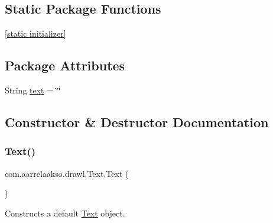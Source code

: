 \subsection*{Static Package Functions}
\begin{DoxyCompactItemize}
\item 
\hyperlink{classcom_1_1aarrelaakso_1_1drawl_1_1_shape_ad2adcb85374cf5d6d59429628314e8d1}{\mbox{[}static initializer\mbox{]}}
\end{DoxyCompactItemize}
\subsection*{Package Attributes}
\begin{DoxyCompactItemize}
\item 
String \hyperlink{classcom_1_1aarrelaakso_1_1drawl_1_1_text_a8889cc854715e5a1b9195ca490c03865}{text} = \char`\"{}\char`\"{}
\end{DoxyCompactItemize}


\subsection{Constructor \& Destructor Documentation}
\mbox{\label{classcom_1_1aarrelaakso_1_1drawl_1_1_text_a9d9bdd3df91ff551c7bf96f741cde0e9}} 
\subsubsection{\texorpdfstring{Text()}{Text()}\hspace{0.1cm}{\footnotesize\ttfamily [1/2]}}
{\footnotesize\ttfamily com.\+aarrelaakso.\+drawl.\+Text.\+Text (\begin{DoxyParamCaption}{ }\end{DoxyParamCaption})}

Constructs a default \hyperlink{classcom_1_1aarrelaakso_1_1drawl_1_1_text}{Text} object. \mbox{\label{classcom_1_1aarrelaakso_1_1drawl_1_1_text_ab135a782032f1985b39753bd303a3894}} 
